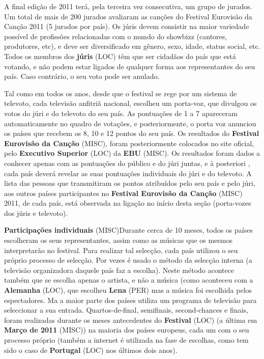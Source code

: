 \documentclass[12pt,a4paper]{article}
\begin{document}
A final edição de 2011 terá, pela terceira vez consecutiva, um grupo de jurados. Um total de mais de 200 jurados avaliaram as canções do Festival Eurovisão da Canção 2011 (5 jurados por país). Os júris devem consistir na maior variedade possível de profissões relacionadas com o mundo do showbizz (cantores, produtores, etc), e deve ser diversificado em gênero, sexo, idade, status social, etc. Todos os membros dos \textbf{júris} (LOC) têm que ser cidadãos do país que está votando, e não podem estar ligados de qualquer forma aos representantes do seu país. Caso contrário, o seu voto pode ser anulado.

Tal como em todos os anos, desde que o festival se rege por um sistema de televoto, cada televisão anfitriã nacional, escolheu um porta-voz, que divulgou os votos do júri e do televoto do seu país. As pontuações de 1 a 7 apareceram automaticamente no quadro de votações, e posteriormente, o porta voz anunciou os países que recebem os 8, 10 e 12 pontos do seu país. Os resultados do \textbf{Festival Eurovisão da Canção} (MISC), foram posteriormente colocados no site oficial, pelo \textbf{Executivo Superior} (LOC) da \textbf{EBU} (MISC). Os resultados foram dados a conhecer apenas com as pontuações do público e do júri juntas, e à posteriori , cada país deverá revelar as suas pontuações individuais do júri e do televoto. A lista das pessoas que transmitiram os pontos atribuídos pelo seu país e pelo júri, aos outros países participantes no \textbf{Festival Eurovisão da Canção} (MISC) 2011, de cada país, está observada na ligação no início desta seção (porta-vozes dos júris e televoto).



\textbf{Participações individuais} (MISC)Durante cerca de 10 meses, todos os países escolheram os seus representantes, assim como as músicas que os mesmos interpretarão no festival. Para realizar tal selecção, cada país utilizou o seu próprio processo de selecção. Por vezes é usado o método da selecção interna (a televisão organizadora daquele país faz a escolha). Neste método acontece também que se escolha apenas o artista, e não a música (como aconteceu com a \textbf{Alemanha} (LOC), que escolheu \textbf{Lena} (PER) mas a música foi escolhida pelos espectadores. Ma a maior parte dos países utiliza um programa de televisão para seleccionar a sua entrada. Quartos-de-final, semifinais, second-chances e finais, foram realizadas durante os meses antecedentes do \textbf{Festival} (LOC) (a última em \textbf{Março de 2011} (MISC)) na maioria dos países europeus, cada um com o seu processo próprio (também a internet é utilizada na fase de escolhas, como tem sido o caso de \textbf{Portugal} (LOC) nos últimos dois anos).
\end{document}
